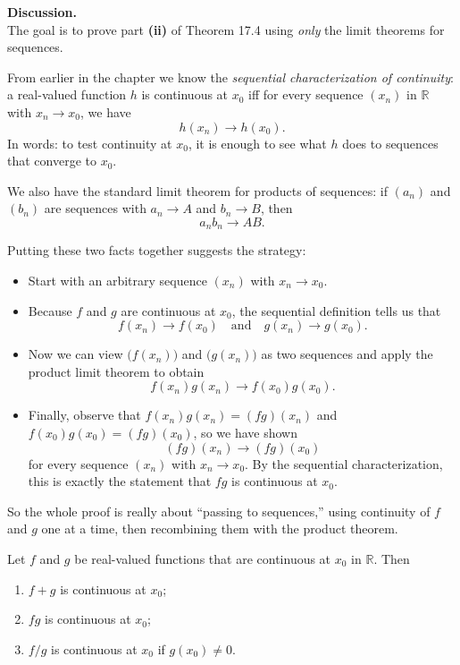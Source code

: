 \documentclass[12pt]{article}
\newenvironment{theorembox}[1][]%
{\begin{tcolorbox}[theoremstyle,title={#1}]}%
{\end{tcolorbox}}
\begin{document}
\textbf{Discussion.} \\
The goal is to prove part \textbf{(ii)} of Theorem 17.4 using \emph{only} the
limit theorems for sequences.

From earlier in the chapter we know the \emph{sequential characterization of
continuity}: a real-valued function $h$ is continuous at $x_0$ iff for every
sequence $(x_n)$ in $\mathbb{R}$ with $x_n \to x_0$, we have
\[
  h(x_n) \to h(x_0).
\]
In words: to test continuity at $x_0$, it is enough to see what $h$ does to
sequences that converge to $x_0$.

We also have the standard limit theorem for products of sequences:
if $(a_n)$ and $(b_n)$ are sequences with $a_n \to A$ and $b_n \to B$, then
\[
  a_n b_n \to AB.
\]

Putting these two facts together suggests the strategy:

\begin{itemize}
  \item Start with an arbitrary sequence $(x_n)$ with $x_n \to x_0$.
  \item Because $f$ and $g$ are continuous at $x_0$, the sequential definition
        tells us that
        \[
          f(x_n) \to f(x_0) \quad\text{and}\quad g(x_n) \to g(x_0).
        \]
  \item Now we can view $\big(f(x_n)\big)$ and $\big(g(x_n)\big)$ as two
        sequences and apply the product limit theorem to obtain
        \[
          f(x_n)g(x_n) \to f(x_0)g(x_0).
        \]
  \item Finally, observe that $f(x_n)g(x_n) = (fg)(x_n)$ and
        $f(x_0)g(x_0) = (fg)(x_0)$, so we have shown
        \[
          (fg)(x_n) \to (fg)(x_0)
        \]
        for every sequence $(x_n)$ with $x_n \to x_0$.
        By the sequential characterization, this is exactly the statement
        that $fg$ is continuous at $x_0$.
\end{itemize}

So the whole proof is really about “passing to sequences,” using continuity of
$f$ and $g$ one at a time, then recombining them with the product theorem.

\begin{theorembox}[17.4 Theorem]
Let $f$ and $g$ be real-valued functions that are continuous at $x_0$ in $\mathbb{R}$.  
Then  
\begin{enumerate}[label=\textbf{(\roman*)}]
    \item $f + g$ is continuous at $x_0$;
    \item $fg$ is continuous at $x_0$;
    \item $f/g$ is continuous at $x_0$ if $g(x_0) \ne 0$.
\end{enumerate}
\end{theorembox}
\vspace{0.25em}
\end{document}
